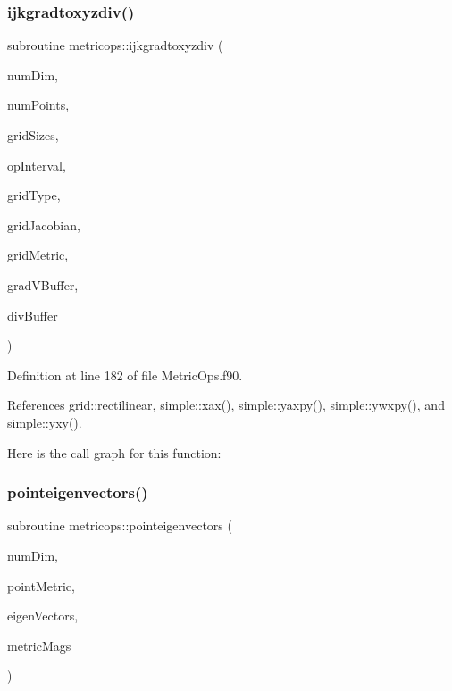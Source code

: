 \subsubsection{\texorpdfstring{ijkgradtoxyzdiv()}{ijkgradtoxyzdiv()}}
{\footnotesize\ttfamily subroutine metricops\+::ijkgradtoxyzdiv (\begin{DoxyParamCaption}\item[{integer(kind=4), intent(in)}]{num\+Dim,  }\item[{integer(kind=8), intent(in)}]{num\+Points,  }\item[{integer(kind=8), dimension(numdim), intent(in)}]{grid\+Sizes,  }\item[{integer(kind=8), dimension(2$\ast$numdim), intent(in)}]{op\+Interval,  }\item[{integer(kind=4), intent(in)}]{grid\+Type,  }\item[{real(kind=8), dimension(numpoints), intent(in)}]{grid\+Jacobian,  }\item[{real(kind=8), dimension(numdim$\ast$numdim$\ast$numpoints), intent(in), target}]{grid\+Metric,  }\item[{real(kind=8), dimension(numdim$\ast$numdim$\ast$numpoints), intent(in), target}]{grad\+V\+Buffer,  }\item[{real(kind=8), dimension(numpoints), intent(out)}]{div\+Buffer }\end{DoxyParamCaption})}



Definition at line 182 of file Metric\+Ops.\+f90.



References grid\+::rectilinear, simple\+::xax(), simple\+::yaxpy(), simple\+::ywxpy(), and simple\+::yxy().

Here is the call graph for this function\+:
\hypertarget{namespacemetricops_af7524e334ad2b738e5ecd980dbc92041}{}\label{namespacemetricops_af7524e334ad2b738e5ecd980dbc92041} 
\subsubsection{\texorpdfstring{pointeigenvectors()}{pointeigenvectors()}}
{\footnotesize\ttfamily subroutine metricops\+::pointeigenvectors (\begin{DoxyParamCaption}\item[{integer(kind=4), intent(in)}]{num\+Dim,  }\item[{real(kind=8), dimension(numdim$\ast$numdim), intent(in)}]{point\+Metric,  }\item[{real(kind=8), dimension(numdim$\ast$numdim), intent(out)}]{eigen\+Vectors,  }\item[{real(kind=8), dimension(numdim), intent(out)}]{metric\+Mags }\end{DoxyParamCaption})}



